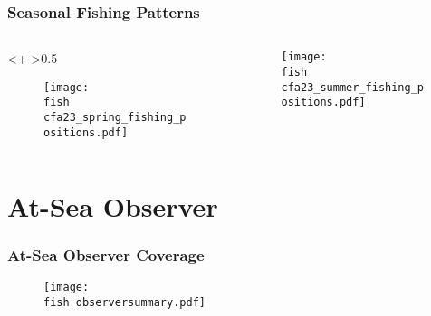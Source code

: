 \documentclass{beamer}
\begin{document}
\begin{frame}
\frametitle{Seasonal Fishing Patterns}

\begin{columns}
\begin{column}<+->{0.5\textwidth}
 \vspace*{-0.5cm}
\begin{figure}
\centerline{\texttt{[image: \\fish cfa23\_spring\_fishing\_positions.pdf]}}

\end{figure}
\end{column}

\begin{column}{0.5\textwidth}
\begin{figure}
 \vspace*{-0.5cm}

\centerline{\texttt{[image: \\fish cfa23\_summer\_fishing\_positions.pdf]}}

 \end{figure}

\end{column}
\end{columns}

\end{frame}



\section{At-Sea Observer}



\begin{frame}
	\frametitle{At-Sea Observer Coverage}
	\begin{figure}
		
		\vspace*{-.5cm}
		\centerline{\texttt{[image: \\fish observersummary.pdf]}}
		
	\end{figure}
\end{frame}



\end{document}
